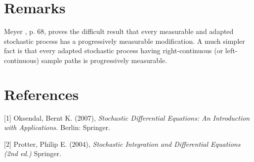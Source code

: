
\section{Remarks}
Meyer \cite{Mey1966}, p. 68, proves the difficult result that every
measurable and adapted stochastic process has a progressively measurable
modification. A much simpler fact is that every adapted stochastic
process having right-continuous (or left-continuous) sample paths is
progressively measurable.

\section{References}

[1] Oksendal, Bernt K. (2007),
{\it Stochastic Differential Equations: An Introduction with Applications.}
Berlin: Springer. 

[2] Protter, Philip E. (2004),
{\it Stochastic Integration and Differential Equations (2nd ed.)}
Springer.


